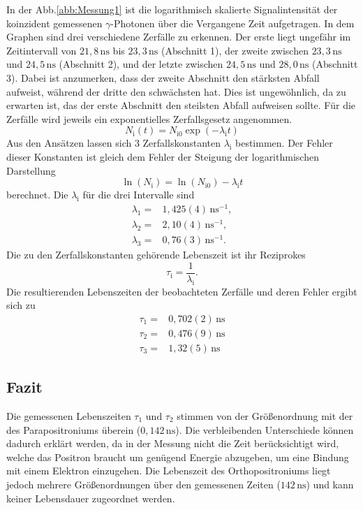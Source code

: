 \documentclass[numbers=noenddot,a4paper]{scrartcl}
\begin{document}
In der Abb.\ref{abb:Messung1} ist die logarithmisch skalierte Signalintensität der koinzident gemessenen $\gamma$-Photonen über die Vergangene Zeit aufgetragen.
In dem Graphen sind drei verschiedene Zerfälle zu erkennen. Der erste liegt ungefähr im Zeitintervall von $21,8\,\mathrm{ns}$ bis $23,3\,\mathrm{ns}$ (Abschnitt 1), der zweite zwischen $23,3\,\mathrm{ns}$ und $24,5\,\mathrm{ns}$ (Abschnitt 2), und der letzte zwischen $24,5\,\mathrm{ns}$ und $28,0\,\mathrm{ns}$ (Abschnitt 3). Dabei ist anzumerken, dass der zweite Abschnitt den stärksten Abfall aufweist, während der dritte den schwächsten hat. Dies ist ungewöhnlich, da zu erwarten ist, das der erste Abschnitt den steilsten Abfall aufweisen sollte. 
Für die Zerfälle wird jeweils ein exponentielles Zerfallsgesetz angenommen.
\begin{equation}
N_\mathrm{i}(t) = N_{\mathrm{i}0} \exp\left(-\lambda_\mathrm{i} t\right)
\end{equation}
Aus den Ansätzen lassen sich 3 Zerfallskonstanten $\lambda_\mathrm{i}$ bestimmen. Der Fehler dieser Konstanten ist gleich dem Fehler der Steigung der logarithmischen Darstellung
\begin{equation}
\ln\left(N_\mathrm{i}\right) = \ln\left(N_{\mathrm{i}0}\right) - \lambda_\mathrm{i}t
\end{equation}
berechnet. Die $\lambda_\mathrm{i}$ für die drei Intervalle sind
\begin{align}
\lambda_1 =& 1,425(4)\,\mathrm{ns}^{-1}, \nonumber \\
\lambda_{2} =& 2,10(4)\,\mathrm{ns}^{-1},  \\
\lambda_{3} =& 0,76(3)\,\mathrm{ns}^{-1}. \nonumber 
\end{align}
Die zu den Zerfallskonstanten gehörende Lebenszeit ist ihr Reziprokes
\begin{equation}
\tau_\mathrm{i} = \frac{1}{\lambda_\mathrm{i}}.
\end{equation}
Die resultierenden Lebenszeiten der beobachteten Zerfälle und deren Fehler ergibt sich zu
\begin{align}
\tau_{1} =& 0,702(2)\,\mathrm{ns} \nonumber \\
\tau_{2} =& 0,476(9)\,\mathrm{ns} \\
\tau_{3} =& 1,32(5)\,\mathrm{ns} \nonumber 
\end{align}
\subsection{Fazit}
Die gemessenen Lebenszeiten $\tau_1$ und $\tau_2$ stimmen von der Größenordnung mit der des Parapositroniums überein ($0,142\,\mathrm{ns}$). Die verbleibenden Unterschiede können dadurch erklärt werden, da in der Messung nicht die Zeit berücksichtigt wird, welche das Positron braucht um genügend Energie abzugeben, um eine Bindung mit einem Elektron einzugehen. Die Lebenszeit des Orthopositroniums liegt jedoch mehrere Größenordnungen über den gemessenen Zeiten ($142\,\mathrm{ns}$) und kann keiner Lebensdauer zugeordnet werden.\\
\end{document}
